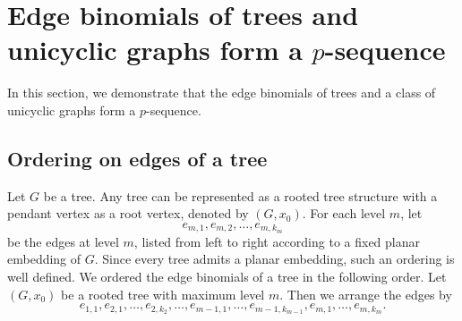 \documentclass[11pt,a4paper,reqno]{amsart}
\theoremstyle{definition}
\begin{document}
\section{Edge binomials of trees and unicyclic graphs form a $p$-sequence} \label{sec.p-seqbei}

In this section, we demonstrate that the edge binomials of trees and a class of unicyclic graphs form a $p$-sequence.


\subsection{Ordering on edges of a tree} \label{oderseqtree} Let $G$ be a tree. Any tree can be represented as a rooted tree structure with a pendant vertex as a root vertex, denoted by $(G,x_0)$. For each level \(m\), let 
\[
e_{m,1}, e_{m,2}, \ldots, e_{m,k_m}
\]
be the edges at level \(m\), listed from left to right according to a fixed planar embedding of \(G\). Since every tree admits a planar embedding, such an ordering is well defined. We ordered the edge binomials of a tree in the following order. Let $(G,x_0)$ be a rooted tree with maximum level $m$. Then we arrange the edges  by $$e_{1,1},e_{2,1},\ldots,e_{2,k_2},\ldots,e_{m-1,1},\ldots, e_{m-1,k_{m-1}}, e_{m,1},\ldots,e_{m,k_m}.$$
\end{document}

